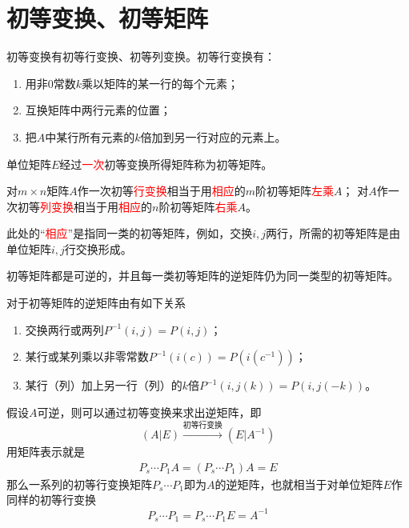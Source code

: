 \section{初等变换、初等矩阵}
初等变换有初等行变换、初等列变换。初等行变换有：
\begin{enumerate}[(1)]
    \item 用非$0$常数$k$乘以矩阵的某一行的每个元素；
    \item 互换矩阵中两行元素的位置；
    \item 把$A$中某行所有元素的$k$倍加到另一行对应的元素上。
\end{enumerate}
\begin{definition}
    单位矩阵$E$经过\textcolor{red}{一次}初等变换所得矩阵称为初等矩阵。
\end{definition}
\begin{theorem}
    对$m\times n$矩阵$A$作一次初等\textcolor{red}{行变换}相当于用\textcolor{red}{相应}的$m$阶初等矩阵\textcolor{red}{左乘}$A$；
    对$A$作一次初等\textcolor{red}{列变换}相当于用\textcolor{red}{相应}的$n$阶初等矩阵\textcolor{red}{右乘}$A$。
\end{theorem}
此处的“\textcolor{red}{相应}”是指同一类的初等矩阵，例如，交换$i,j$两行，所需的初等矩阵是由单位矩阵$i,j$行交换形成。
\begin{theorem}
    初等矩阵都是可逆的，并且每一类初等矩阵的逆矩阵仍为同一类型的初等矩阵。
\end{theorem}
对于初等矩阵的逆矩阵由有如下关系
\begin{enumerate}[(1)]
    \item 交换两行或两列$P^{-1}(i,j) = P(i,j)$；
    \item 某行或某列乘以非零常数$P^{-1}(i(c)) = P(i(c^{-1}))$；
    \item 某行（列）加上另一行（列）的$k$倍$P^{-1}(i,j(k)) = P(i,j(-k))$。
\end{enumerate}

假设$A$可逆，则可以通过初等变换来求出逆矩阵，即
\[ (A|E)\xrightarrow{\text{初等行变换}}(E|A^{-1}) \]
用矩阵表示就是
\begin{align*}
    P_s\cdots P_1A = (P_s\cdots P_1)A  = E
\end{align*}
那么一系列的初等行变换矩阵$P_s\cdots P_1$即为$A$的逆矩阵，也就相当于对单位矩阵$E$作同样的初等行变换
\[ P_s\cdots P_1 = P_s\cdots P_1E = A^{-1} \]

